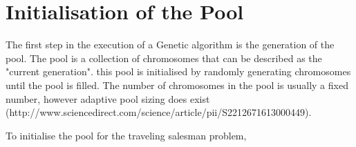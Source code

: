 \section{Initialisation of the Pool}
\par
The first step in the execution of a Genetic algorithm is the generation of the pool. The pool is a collection of chromosomes that can be described as the "current generation". this pool is initialised by randomly generating chromosomes until the pool is filled. The number of chromosomes in the pool is usually a fixed number, however adaptive pool sizing does exist (http://www.sciencedirect.com/science/article/pii/S2212671613000449). 
\par
To initialise the pool for the traveling salesman problem, 
\section{}